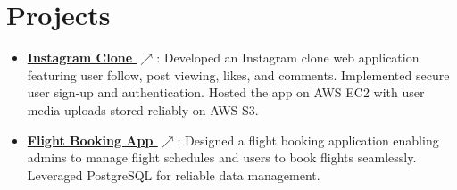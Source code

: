 \documentclass[a4paper,11pt]{article}
\newcommand{\linkicon}{{\color{black}\tiny$\nearrow$}} %
\newcommand{\resumeItem}[2]{
  \item\small{
    \textbf{#1}{: #2 \vspace{-2pt}}
  }
}
\newcommand{\resumeSubItem}[2]{\resumeItem{#1}{#2}\vspace{-4pt}}
\newcommand{\resumeSubHeadingListStart}{\begin{itemize}[leftmargin=*]}
\newcommand{\resumeSubHeadingListEnd}{\end{itemize}}
\begin{document}
\section{Projects}
  \resumeSubHeadingListStart
    \resumeSubItem{\href{https://github.com/shubham8456/insta-clone}{Instagram Clone \linkicon}}
    {Developed an Instagram clone web application featuring user follow, post viewing, likes, and comments. Implemented secure user sign-up and authentication. Hosted the app on AWS EC2 with user media uploads stored reliably on AWS S3.}
    \resumeSubItem{\href{https://github.com/shubham8456/flight_booking_app}{Flight Booking App \linkicon}}
    {Designed a flight booking application enabling admins to manage flight schedules and users to book flights seamlessly. Leveraged PostgreSQL for reliable data management.}
  \resumeSubHeadingListEnd
\end{document}
